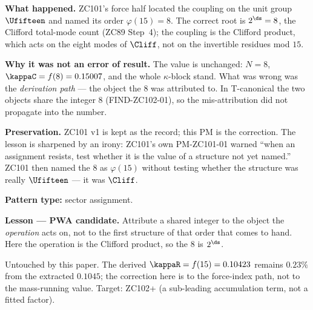 \documentclass[12pt, a4paper]{article}
\begin{document}
\begin{derivedbox}[title={PM-ZC101-02: The Force Index Was Read off the Wrong Eight (Failure Stance)}]
\textbf{What happened.} ZC101's force half located the coupling on the unit
group $\Ufifteen$ and named its order $\varphi(15)=8$. The correct root is
$2^{\ds}=8$, the Clifford total-mode count (ZC89 Step~4); the coupling is the
Clifford product, which acts on the eight modes of $\Cliff$, not on the
invertible residues mod $15$.

\textbf{Why it was not an error of result.} The value is unchanged: $N=8$,
$\kappaC=f(8)=0.15007$, and the whole $\kappa$-block stand. What was wrong was
the \emph{derivation path} --- the object the $8$ was attributed to. In
T-canonical the two objects share the integer $8$ (FIND-ZC102-01), so the
mis-attribution did not propagate into the number.

\textbf{Preservation.} ZC101 v1 is kept as the record; this PM is the
correction. The lesson is sharpened by an irony: ZC101's own PM-ZC101-01 warned
``when an assignment resists, test whether it is the value of a structure not
yet named.'' ZC101 then named the $8$ as $\varphi(15)$ without testing whether
the structure was really $\Ufifteen$ --- it was $\Cliff$.

\textbf{Pattern type:} sector assignment.

\textbf{Lesson --- PWA candidate.} Attribute a shared integer to the object the
\emph{operation} acts on, not to the first structure of that order that comes to
hand. Here the operation is the Clifford product, so the $8$ is $2^{\ds}$.
\end{derivedbox}

\begin{openqbox}[title={GAP-ZC101-02 (carried): The $0.23\%$ residual}]
Untouched by this paper. The derived $\kappaR=f(15)=0.10423$ remains $0.23\%$
from the extracted $0.1045$; the correction here is to the force-index path, not
to the mass-running value. Target: ZC102+ (a sub-leading accumulation term, not
a fitted factor).
\end{openqbox}
\end{document}
